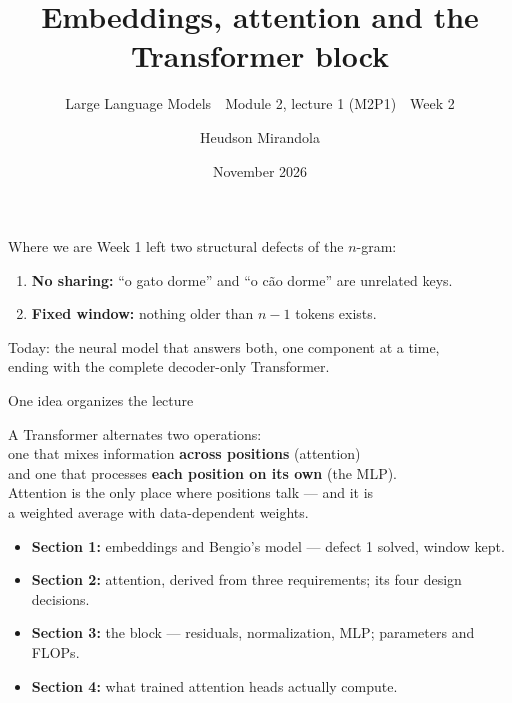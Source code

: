 \documentclass[11pt,aspectratio=169]{beamer}
\title{Embeddings, attention and the Transformer block}
\subtitle{Large Language Models \,\textperiodcentered\, Module 2, lecture 1 (M2P1) \,\textperiodcentered\, Week 2}
\author{Heudson Mirandola}
\institute{Instituto de Matemática, UFRJ}
\date{November 2026}
\begin{document}
\begin{frame}[plain]
  \titlepage
\end{frame}

\begin{frame}{Where we are}
  Week 1 left two structural defects of the $n$-gram:
  \begin{enumerate}
    \item \textbf{No sharing:} ``o gato dorme'' and ``o cão dorme'' are unrelated keys.
    \item \textbf{Fixed window:} nothing older than $n-1$ tokens exists.
  \end{enumerate}

  \vspace{1em}
  Today: the neural model that answers both, one component at a time,\\
  ending with the complete decoder-only Transformer.
\end{frame}

\begin{frame}{One idea organizes the lecture}
  \begin{block}{}
    \centering\large
    A Transformer alternates two operations:\\[0.3em]
    one that mixes information \textbf{across positions} (attention)\\
    and one that processes \textbf{each position on its own} (the MLP).\\[0.5em]
    Attention is the only place where positions talk --- and it is\\
    a weighted average with data-dependent weights.
  \end{block}

  \vspace{0.8em}
  \begin{itemize}
    \item \textbf{Section 1:} embeddings and Bengio's model --- defect 1 solved, window kept.
    \item \textbf{Section 2:} attention, derived from three requirements; its four design decisions.
    \item \textbf{Section 3:} the block --- residuals, normalization, MLP; parameters and FLOPs.
    \item \textbf{Section 4:} what trained attention heads actually compute.
  \end{itemize}
\end{frame}
\end{document}
